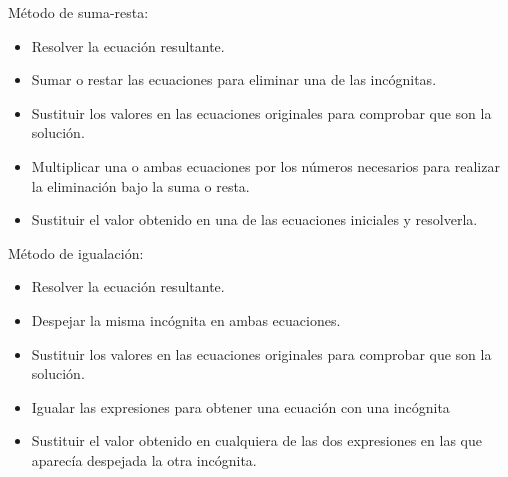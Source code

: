 \documentclass[12pt,repaso,answers]{repaso_layout}
\begin{document}
\begin{questions}
{\begin{choices}
            \choice M\'etodo de suma-resta:
            \begin{itemize}
                \item[\rule{1cm}{0.2mm}] Resolver la ecuaci\'on resultante.
                \item[\rule{1cm}{0.2mm}] Sumar o restar las ecuaciones para eliminar una de las inc\'ognitas.
                \item[\rule{1cm}{0.2mm}] Sustituir los valores en las ecuaciones originales para comprobar que son la soluci\'on.
                \item[\rule{1cm}{0.2mm}] Multiplicar una o ambas ecuaciones por los n\'umeros necesarios para realizar la eliminaci\'on bajo la suma o resta.
                \item[\rule{1cm}{0.2mm}] Sustituir el valor obtenido en una de las ecuaciones iniciales y resolverla.
            \end{itemize}


            \choice M\'etodo de igualaci\'on:
            \begin{itemize}
                \item[\rule{1cm}{0.2mm}] Resolver la ecuaci\'on resultante.
                \item[\rule{1cm}{0.2mm}] Despejar la misma inc\'ognita en ambas ecuaciones.
                \item[\rule{1cm}{0.2mm}] Sustituir los valores en las ecuaciones originales para comprobar que son la soluci\'on.
                \item[\rule{1cm}{0.2mm}] Igualar las expresiones para obtener una ecuaci\'on con una inc\'ognita
                \item[\rule{1cm}{0.2mm}] Sustituir el valor obtenido en cualquiera de las dos expresiones en las que aparec\'ia despejada la otra inc\'ognita.
            \end{itemize}
        \end{choices}
    }


\end{questions}
\end{document}
